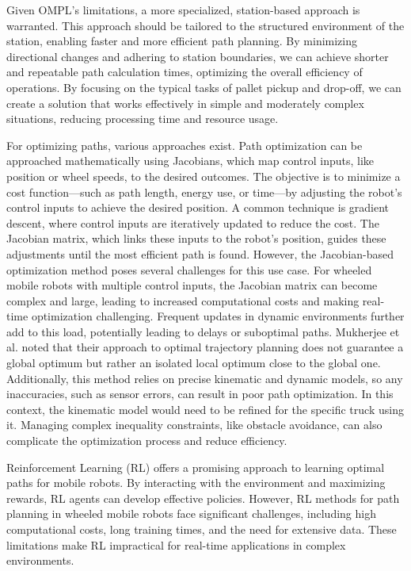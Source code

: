 Given OMPL's limitations, a more specialized, station-based approach is warranted. This approach should be tailored 
to the structured environment of the station, enabling faster and more efficient path planning. 
By minimizing directional changes and adhering to station boundaries, we can achieve shorter and repeatable 
path calculation times, optimizing the overall efficiency of operations. By focusing on the typical tasks of pallet 
pickup and drop-off, we can create a solution that works effectively in simple and moderately complex 
situations, reducing processing time and resource usage. 

For optimizing paths, various approaches exist.
Path optimization can be approached mathematically using Jacobians, which map control inputs, like position or wheel 
speeds, to the desired outcomes. The objective is to minimize a cost function—such as path length, energy use, 
or time—by adjusting the robot's control inputs to achieve the desired position. A common technique is gradient descent, 
where control inputs are iteratively updated to reduce the cost. The Jacobian matrix, which links these 
inputs to the robot's position, guides these adjustments until the most efficient path is found. However, the Jacobian-based 
optimization method poses several challenges for this use case. For wheeled mobile robots with multiple control inputs, 
the Jacobian matrix can become complex and large, leading to increased computational costs and making real-time 
optimization challenging. 
Frequent updates in dynamic environments further add to this load, potentially leading to delays or suboptimal paths. 
Mukherjee et al. \cite{R44} noted that their approach to optimal trajectory planning does not guarantee a global 
optimum but rather an isolated local optimum close to the global one. Additionally, this method relies on precise 
kinematic and dynamic models, so any inaccuracies, such as sensor errors, can result in poor path optimization. 
In this context, the kinematic model would need to be refined for the specific truck using it. Managing complex inequality 
constraints, like obstacle avoidance, can also complicate the optimization process and reduce efficiency.

Reinforcement Learning (RL) offers a promising approach to learning optimal paths for mobile robots. By interacting 
with the environment and maximizing rewards, RL agents can develop effective policies. However, RL methods for 
path planning in wheeled mobile robots face significant challenges, including high computational costs, long 
training times, and the need for extensive data. These limitations make RL impractical for real-time applications 
in complex environments.

